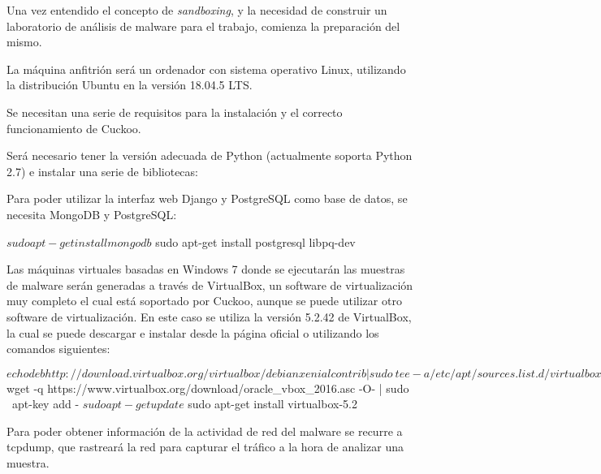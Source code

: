 \label{anexo-a}
\noindent Una vez entendido el concepto de \textit{sandboxing}, y la necesidad de construir un laboratorio de análisis de malware para el trabajo, comienza la preparación del mismo.

La máquina anfitrión será un ordenador con sistema operativo Linux, utilizando la distribución Ubuntu en la versión 18.04.5 \gls{LTS}.

Se necesitan una serie de requisitos para la instalación y el correcto funcionamiento de Cuckoo.

Será necesario tener la versión adecuada de Python (actualmente soporta Python 2.7) e instalar una serie de bibliotecas:


Para poder utilizar la interfaz web Django y PostgreSQL como base de datos, se necesita MongoDB y PostgreSQL:

\begin{listing}[style=consola, numbers=none]
$ sudo apt-get install mongodb
$ sudo apt-get install postgresql libpq-dev
\end{listing}

Las máquinas virtuales basadas en Windows 7 donde se ejecutarán las muestras de malware serán generadas a través de VirtualBox, un software de virtualización muy completo el cual está soportado por Cuckoo, aunque se puede utilizar otro software de virtualización. En este caso se utiliza la versión 5.2.42 de VirtualBox, la cual se puede descargar e instalar desde la página oficial o utilizando los comandos siguientes:

\begin{listing}[style=consola, numbers=none]
$ echo deb http://download.virtualbox.org/virtualbox/debian xenial contrib | sudo \
tee -a /etc/apt/sources.list.d/virtualbox.list
$ wget -q https://www.virtualbox.org/download/oracle_vbox_2016.asc -O- | sudo \
apt-key add -
$ sudo apt-get update
$ sudo apt-get install virtualbox-5.2
\end{listing}

Para poder obtener información de la actividad de red del malware se recurre a tcpdump, que rastreará la red para capturar el tráfico a la hora de analizar una muestra.

